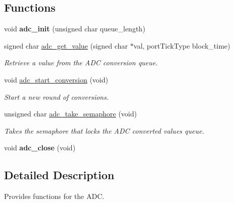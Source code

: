 \subsection*{Functions}
\begin{DoxyCompactItemize}
\item 
\hypertarget{group___a_d_c_ga61c70049c5b909e363cb9ca0eb65bde3}{void {\bfseries adc\-\_\-init} (unsigned char queue\-\_\-length)}\label{group___a_d_c_ga61c70049c5b909e363cb9ca0eb65bde3}

\item 
signed char \hyperlink{group___a_d_c_ga9b8e145352773638696cc0da4b266ac4}{adc\-\_\-get\-\_\-value} (signed char $\ast$val, port\-Tick\-Type block\-\_\-time)
\begin{DoxyCompactList}\small\item\em Retrieve a value from the A\-D\-C conversion queue. \end{DoxyCompactList}\item 
void \hyperlink{group___a_d_c_gacec96a02bae816e24b67875114d526f5}{adc\-\_\-start\-\_\-conversion} (void)
\begin{DoxyCompactList}\small\item\em Start a new round of conversions. \end{DoxyCompactList}\item 
\hypertarget{group___a_d_c_gaf12611a6086c53a57a225df0163bce98}{unsigned char \hyperlink{group___a_d_c_gaf12611a6086c53a57a225df0163bce98}{adc\-\_\-take\-\_\-semaphore} (void)}\label{group___a_d_c_gaf12611a6086c53a57a225df0163bce98}

\begin{DoxyCompactList}\small\item\em Takes the semaphore that locks the A\-D\-C converted values queue. \end{DoxyCompactList}\item 
\hypertarget{group___a_d_c_ga854a565c5d3b3c1e0607c8b7c79d9fd1}{void {\bfseries adc\-\_\-close} (void)}\label{group___a_d_c_ga854a565c5d3b3c1e0607c8b7c79d9fd1}

\end{DoxyCompactItemize}


\subsection{Detailed Description}
Provides functions for the A\-D\-C. 

